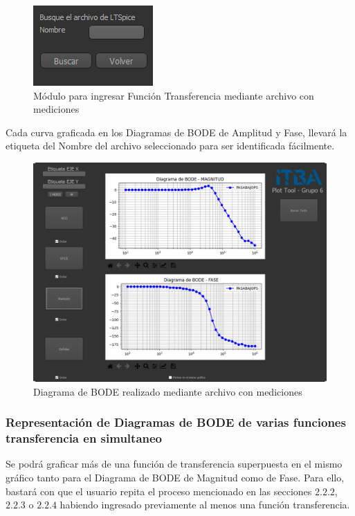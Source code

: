 \begin{figure}[!htb] 
    \centering 
    \includegraphics [scale=0.8]{../EJ2/LatexScreenshots/plotToolSpiceFunctionInput.png} 
    \caption{Módulo para ingresar Función Transferencia mediante archivo con mediciones}
    \label{fig:csvFunctionInputPlotTool}
\end{figure}

Cada curva graficada en los Diagramas de BODE de Amplitud y Fase, llevará la etiqueta del Nombre del archivo seleccionado para ser identificada fácilmente.

\begin{figure}[!htb] 
    \centering 
    \includegraphics [width=0.8
    \textwidth] {../EJ2/LatexScreenshots/plotToolMedicion.png} 
    \caption{Diagrama de BODE realizado mediante archivo con mediciones}
    \label{fig:csvFunctionPlotTool}
\end{figure}

\vspace{3cm}

\subsubsection{Representación de Diagramas de BODE de varias funciones transferencia en simultaneo}

Se podrá graficar más de una función de transferencia superpuesta en el mismo gráfico tanto para el Diagrama de BODE de Magnitud como de Fase.
Para ello, bastará con que el usuario repita el proceso mencionado en las secciones $2.2.2$, $2.2.3$ o $2.2.4$ habiendo ingresado previamente al menos una función transferencia.

